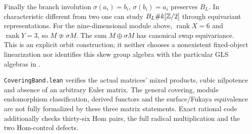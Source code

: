 Finally the branch involution $\sigma(a_i)=b_i$, $\sigma(b_i)=a_i$
preserves $B_L$. In characteristic different from two one can study
$B_L\#k[\mathbb Z/2]$ through equivariant representations. For the nine-dimensional
module above, $\operatorname{rank}X=6$ and $\operatorname{rank}Y=3$, so
$M\not\simeq\sigma M$. The sum $M\oplus\sigma M$ has canonical swap
equivariance. This is an explicit orbit construction; it neither chooses a
nonexistent fixed-object linearization nor identifies this skew group
algebra with the particular GLS algebras in \cite{TameGLS2026}.

\texttt{CoveringBand.lean} verifies the actual matrices' mixed products,
cubic nilpotence and absence of an arbitrary Euler matrix. The general
covering, module endomorphism classification, derived functors and the
surface/Fukaya equivalence are not fully formalized by these three matrix
statements. Exact rational code additionally checks thirty-six Hom pairs,
the full radical multiplication and the two Hom-control defects.
